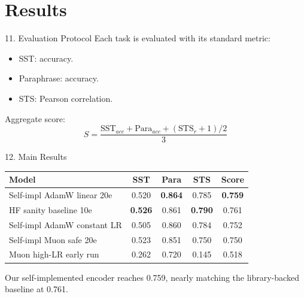 \documentclass[t, aspectratio=169]{beamer}
\begin{document}
\section{Results}

\begin{frame}{11. Evaluation Protocol}
    Each task is evaluated with its standard metric:

    \begin{itemize}
        \item SST: accuracy.
        \item Paraphrase: accuracy.
        \item STS: Pearson correlation.
    \end{itemize}

    \vspace{0.5em}
    Aggregate score:
    \[
        S = \frac{\text{SST}_{acc} + \text{Para}_{acc} + (\text{STS}_{r}+1)/2}{3}
    \]
\end{frame}

\begin{frame}{12. Main Results}
    \begin{center}
    \small
    \begin{tabular}{lcccc}
    \toprule
    Model & SST & Para & STS & Score \\
    \midrule
    Self-impl AdamW linear 20e & 0.520 & \textbf{0.864} & 0.785 & \textbf{0.759} \\
    HF sanity baseline 10e & \textbf{0.526} & 0.861 & \textbf{0.790} & 0.761 \\
    Self-impl AdamW constant LR & 0.505 & 0.860 & 0.784 & 0.752 \\
    Self-impl Muon safe 20e & 0.523 & 0.851 & 0.750 & 0.750 \\
    Muon high-LR early run & 0.262 & 0.720 & 0.145 & 0.518 \\
    \bottomrule
    \end{tabular}
    \end{center}

    \vspace{0.4em}
    Our self-implemented encoder reaches 0.759, nearly matching the library-backed baseline at 0.761.
\end{frame}
\end{document}

